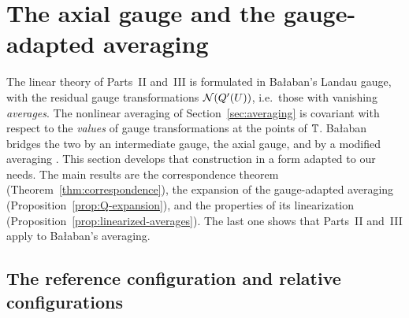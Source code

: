 \section{The axial gauge and the gauge-adapted averaging}\label{sec:adapted}

The linear theory of Parts~II and~III is formulated in Ba\l aban's Landau gauge, with the residual gauge transformations $\mathcal N(Q'(U))$, i.e.\ those with vanishing \emph{averages}. The nonlinear averaging of Section~\ref{sec:averaging} is covariant with respect to the \emph{values} of gauge transformations at the points of $\mathbb T$. Ba\l aban bridges the two by an intermediate gauge, the axial gauge, and by a modified averaging \cite[Sect.~C]{BalAvg}. This section develops that construction in a form adapted to our needs. The main results are the correspondence theorem (Theorem~\ref{thm:correspondence}), the expansion of the gauge-adapted averaging (Proposition~\ref{prop:Q-expansion}), and the properties of its linearization (Proposition~\ref{prop:linearized-averages}). The last one shows that Parts~II and~III apply to Ba\l aban's averaging.

\subsection{The reference configuration and relative configurations}

